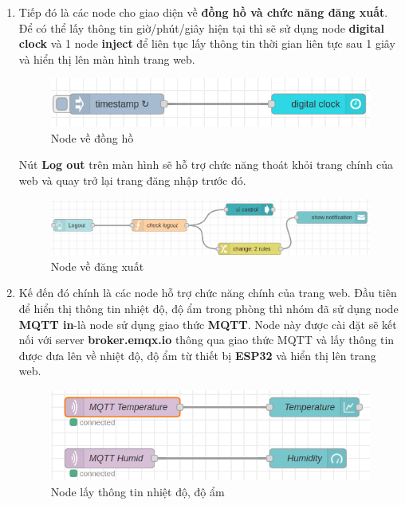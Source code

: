 \documentclass{report}
\begin{document}
\begin{enumerate}
    \item Tiếp đó là các node cho giao diện về \textbf{đồng hồ và chức năng đăng xuất}. Để có thể lấy thông tin giờ/phút/giây hiện tại thì sẽ sử dụng node \textbf{digital clock} và 1 node \textbf{inject} để liên tục lấy thông tin thời gian liên tực sau 1 giây và hiển thị lên màn hình trang web.
    \begin{figure}[H]
        \includegraphics[width=\textwidth, keepaspectratio]{img/flow/clock.png}
        \centering
        \caption{Node về đồng hồ} 
    \end{figure}
    Nút \textbf{Log out} trên màn hình sẽ hỗ trợ chức năng thoát khỏi trang chính của web và quay trở lại trang đăng nhập trước đó.
    \begin{figure}[H]
        \includegraphics[width=\textwidth, keepaspectratio]{img/flow/logout.png}
        \centering
        \caption{Node về đăng xuất}
    \end{figure}

    \item Kế đến đó chính là các node hỗ trợ chức năng chính của trang web. Đầu tiên để  hiển thị thông tin nhiệt độ, độ ẩm trong phòng thì nhóm đã sử dụng node \textbf{MQTT in}-là node sử dụng giao thức \textbf{MQTT}. Node này được cài đặt sẽ kết nối với server \textbf{broker.emqx.io} thông qua giao thức MQTT và lấy thông tin được đưa lên về nhiệt độ, độ ẩm từ thiết bị \textbf{ESP32} và hiển thị lên trang web.
    \begin{figure}[H]
        \includegraphics[width=\textwidth, keepaspectratio]{img/flow/mqtt_in.png}
        \centering
        \caption{Node lấy thông tin nhiệt độ, độ ẩm}
    \end{figure}


\end{enumerate}
\end{document}
